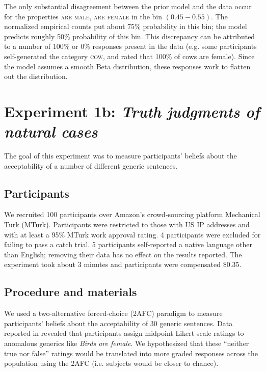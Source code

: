 \documentclass[10pt,letterpaper]{article}
\begin{document}
The only substantial disagreement between the prior model and the data occur for  the properties \textsc{are male, are female} in the bin $(0.45-0.55)$. 
The normalized empirical counts put about 75\% probability in this bin; the model predicts roughly 50\% probability of this bin. 
This discrepancy can be attributed to a number of 100\% or 0\% responses present in the data (e.g. some participants self-generated the category \textsc{cow}, and rated that 100\% of cows are female). 
Since the model assumes a smooth Beta distribution, these responses work to flatten out the distribution.


\section{Experiment 1b: \emph{Truth judgments of natural cases}}
\label{truthjudements:naturalcases}

The goal of this experiment was to measure participants' beliefs about the acceptability of a number of different generic sentences. 

\subsection{Participants}

We recruited 100 participants over Amazon's crowd-sourcing platform Mechanical Turk (MTurk).  
Participants were restricted to those with US IP addresses and with at least a 95\% MTurk work approval rating. 
4 participants were excluded for failing to pass a catch trial.
5 participants self-reported a native language other than English; removing their data has no effect on the results reported. 
The experiment took about 3 minutes and participants were compensated \$0.35.

\subsection{Procedure and materials}

We used a two-alternative forced-choice (2AFC) paradigm to measure participants' beliefs about the acceptability of 30 generic sentences. 
Data reported in  revealed that participants assign midpoint Likert scale ratings to anomalous generics like \emph{Birds are female}. 
We hypothesized that these ``neither true nor false'' ratings would be translated into more graded responses across the population using the 2AFC (i.e. subjects would be closer to chance).
\end{document}
